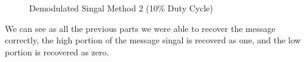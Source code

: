 \documentclass[12pt]{article}
\begin{document}
\begin{figure}[H]
    \centering
    \caption{Demodulated Singal Method 2  (10\% Duty Cycle)}
\end{figure}
We can see as all the previous parts we were able to recover the message correctly, the high portion of the message singal is recoverd as one, and the low portion is recovered as zero.
\end{document}
